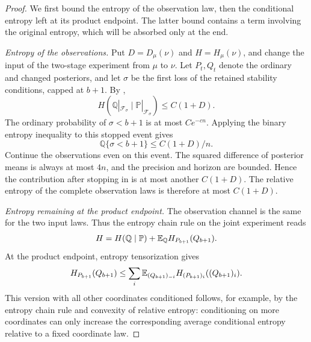 \begin{proof}
We first bound the entropy of the observation law, then the conditional
entropy left at its product endpoint.  The latter bound contains a term
involving the original entropy, which will be absorbed only at the end.

\emph{Entropy of the observations.}
Put $D=D_\mu(\nu)$ and $H=H_\mu(\nu)$, and change the input of the
two-stage experiment from $\mu$ to $\nu$.  Let $P_t,Q_t$ denote the
ordinary and changed posteriors, and let $\sigma$ be the first loss of
the retained stability conditions, capped at $b+1$.
By ,
\begin{equation}\label{eq:stat-stopped-H}
 H(\mathbb Q|_{\mathcal F_\sigma}\mid
       \mathbb P|_{\mathcal F_\sigma})\le C(1+D).
\end{equation}
The ordinary probability of $\sigma<b+1$ is at most $Ce^{-cn}$.
Applying the binary entropy inequality to this stopped event gives
\[
 \mathbb Q\{\sigma<b+1\}\le C(1+D)/n.
\]
Continue the observations even on this event.  The squared difference of
posterior means is always at most $4n$, and the precision and horizon are
bounded.  Hence the contribution after stopping in
 is at most another $C(1+D)$.
The relative entropy of the complete observation laws is therefore at most
$C(1+D)$.

\emph{Entropy remaining at the product endpoint.}
The observation channel is the same for the two input laws.  Thus the
entropy chain rule on the joint experiment reads
\begin{equation}\label{eq:stat-entropy-chain}
 H=H(\mathbb Q\mid\mathbb P)
       +\mathbb E_{\mathbb Q}H_{P_{b+1}}(Q_{b+1}).
\end{equation}
At the product endpoint, entropy tensorization gives
\[
 H_{P_{b+1}}(Q_{b+1})
 \le\sum_i\mathbb E_{(Q_{b+1})_{-i}}
          H_{(P_{b+1})_i}((Q_{b+1})_i).
\]
This version with all other coordinates conditioned follows, for example,
by the entropy chain rule and convexity of relative entropy: conditioning
on more coordinates can only increase the corresponding average conditional
entropy relative to a fixed coordinate law.


\end{proof}
